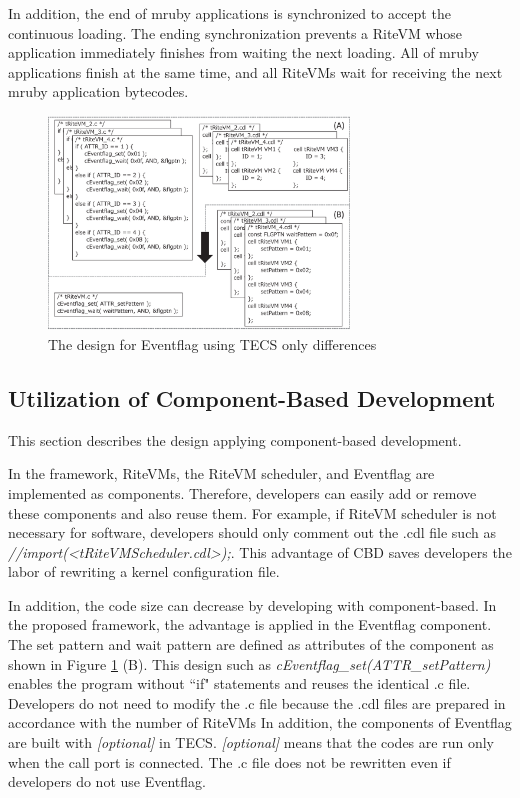\documentclass{sig-alternate-05-2015}
\begin{document}
In addition, the end of mruby applications is synchronized to accept the continuous loading.
The ending synchronization prevents a RiteVM whose application immediately finishes from waiting the next loading.
All of mruby applications finish at the same time, and all RiteVMs wait for receiving the next mruby application bytecodes. 

\begin{figure}[t]
    \centering
    \includegraphics[width=8cm,clip]{figure/Eventflag.eps}
    \caption{The design for Eventflag using TECS {\scriptsize *only differences}}
    \label{fig:Eventflag}
\end{figure}
 
\subsection{Utilization of Component-Based Development}
This section describes the design applying component-based development.

In the framework, RiteVMs, the RiteVM scheduler, and Eventflag are implemented as components.
Therefore, developers can easily add or remove these components and also reuse them.
For example, if RiteVM scheduler is not necessary for software, developers should only comment out the .cdl file such as {\it //import(<tRiteVMScheduler.cdl>);}.
This advantage of CBD saves developers the labor of rewriting a kernel configuration file.

In addition, the code size can decrease by developing with component-based. 
In the proposed framework, the advantage is applied in the Eventflag component.
The set pattern and wait pattern are defined as attributes of the component as shown in Figure \ref{fig:Eventflag} (B).
This design such as {\it cEventflag\_set(ATTR\_setPattern)} enables the program without ``if" statements and reuses the identical .c file.
Developers do not need to modify the .c file because the .cdl files are prepared in accordance with the number of RiteVMs
In addition, the components of Eventflag are built with {\it [optional]} in TECS.
{\it [optional]} means that the codes are run only when the call port is connected.
The .c file does not be rewritten even if developers do not use Eventflag. 
\end{document}
